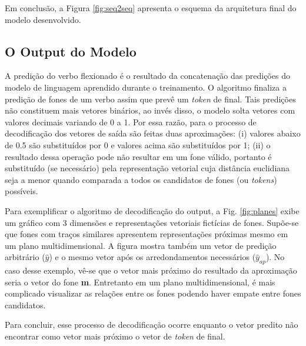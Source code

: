Em conclusão, a Figura \ref{fig:seq2seq} apresenta o esquema da arquitetura final do modelo desenvolvido. 



 \subsection{O Output do Modelo}

A predição do verbo flexionado é o resultado da concatenação das predições do modelo de linguagem aprendido durante o treinamento. O algoritmo finaliza a predição de fones de um verbo assim que prevê um \textit{token} de final. Tais predições não constituem mais vetores binários, ao invés disso, o modelo solta vetores com valores decimais variando de 0 a 1. Por essa razão, para o processo de decodificação dos vetores de saída são feitas duas aproximações: (i) valores abaixo de 0.5 são substituídos por 0 e valores acima são substituídos por 1; (ii) o resultado dessa operação pode não resultar em um fone válido, portanto é substituído (se necessário) pela representação vetorial cuja distância euclidiana seja a menor quando comparada a todos os candidatos de fones (ou \textit{tokens}) possíveis. 



Para exemplificar o algoritmo de decodificação do output, a Fig. \ref{fig:planes} exibe um gráfico com 3 dimensões e representações vetoriais fictícias de fones. Supõe-se que fones com traços similares apresentem representações próximas mesmo em um plano multidimensional. A figura mostra também um vetor de predição arbitrário ($\hat{y}$) e o mesmo vetor após os arredondamentos necessários ($\hat{y}_{ap}$). No caso desse exemplo, vê-se que o vetor mais próximo do resultado da aproximação seria o vetor do fone \textbf{m}. Entretanto em um plano multidimensional, é mais complicado visualizar as relações entre os fones podendo haver empate entre fones candidatos. 

Para concluir, esse processo de decodificação ocorre enquanto o vetor predito não encontrar como vetor mais próximo o vetor de \textit{token} de final. 







